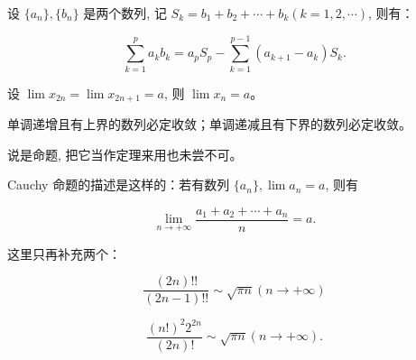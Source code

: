 \documentclass[lang=cn,10pt,twoside]{elegantbook}
\begin{document}
\begin{proposition}[Abel 变换]
  设 $\{a_n\}, \{b_n\}$ 是两个数列, 记 $S_k = b_1 + b_2 + \cdots + b_k (k = 1,2,\cdots)$, 则有：

  \begin{equation*}
    \sum_{k=1}^p a_kb_k = a_pS_p - \sum_{k=1}^{p-1} (a_{k+1} - a_k) S_k.
  \end{equation*}
\end{proposition}
\begin{theorem}[“拉链”定理]
  设 $\lim x_{2n} = \lim x_{2n+1} = a$, 则 $\lim x_n = a$。
\end{theorem}
\begin{theorem}[单调有界定理]
  单调递增且有上界的数列必定收敛；单调递减且有下界的数列必定收敛。
\end{theorem}
\begin{proposition}[Cauchy 命题]
  说是命题, 把它当作定理来用也未尝不可。
  
  Cauchy 命题的描述是这样的：若有数列 $\{a_n\}, \lim a_n = a$, 则有
  
  $$\lim\limits_{n \rightarrow +\infty} \frac{a_1 + a_2 + \cdots + a_n}{n} = a.$$
\end{proposition}
\begin{proposition}[Wallis 公式]
  这里只再补充两个：

  \begin{equation*}
    \frac{(2n)!!}{(2n-1)!!} \sim \sqrt{\pi n} (n \rightarrow +\infty)
  \end{equation*}

  \begin{equation*}
    \frac{(n!)^2 2^{2n}}{(2n)!} \sim \sqrt{\pi n} (n \rightarrow +\infty).
  \end{equation*}
\end{proposition}
\end{document}
